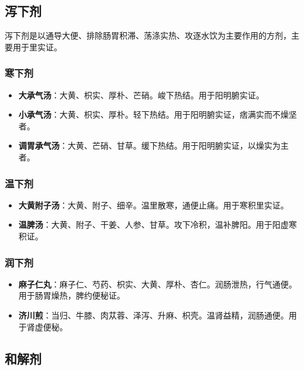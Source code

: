 \documentclass[12pt,UTF8]{ctexbook}
\begin{document}
\subsection{泻下剂}

泻下剂是以通导大便、排除肠胃积滞、荡涤实热、攻逐水饮为主要作用的方剂，主要用于里实证。

\subsubsection{寒下剂}

\begin{itemize}
\item \textbf{大承气汤}：大黄、枳实、厚朴、芒硝。峻下热结。用于阳明腑实证。
\item \textbf{小承气汤}：大黄、枳实、厚朴。轻下热结。用于阳明腑实证，痞满实而不燥坚者。
\item \textbf{调胃承气汤}：大黄、芒硝、甘草。缓下热结。用于阳明腑实证，以燥实为主者。
\end{itemize}

\subsubsection{温下剂}

\begin{itemize}
\item \textbf{大黄附子汤}：大黄、附子、细辛。温里散寒，通便止痛。用于寒积里实证。
\item \textbf{温脾汤}：大黄、附子、干姜、人参、甘草。攻下冷积，温补脾阳。用于阳虚寒积证。
\end{itemize}

\subsubsection{润下剂}

\begin{itemize}
\item \textbf{麻子仁丸}：麻子仁、芍药、枳实、大黄、厚朴、杏仁。润肠泄热，行气通便。用于肠胃燥热，脾约便秘证。
\item \textbf{济川煎}：当归、牛膝、肉苁蓉、泽泻、升麻、枳壳。温肾益精，润肠通便。用于肾虚便秘。
\end{itemize}

\subsection{和解剂}
\end{document}
